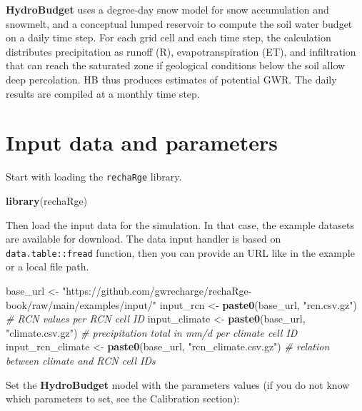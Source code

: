 \documentclass[
]{book}
\newenvironment{Shaded}{\begin{snugshade}}{\end{snugshade}}
\newcommand{\CommentTok}[1]{\textcolor[rgb]{0.56,0.35,0.01}{\textit{#1}}}
\newcommand{\FunctionTok}[1]{\textcolor[rgb]{0.13,0.29,0.53}{\textbf{#1}}}
\newcommand{\NormalTok}[1]{#1}
\newcommand{\OtherTok}[1]{\textcolor[rgb]{0.56,0.35,0.01}{#1}}
\newcommand{\StringTok}[1]{\textcolor[rgb]{0.31,0.60,0.02}{#1}}
\begin{document}
\textbf{HydroBudget} uses a degree-day snow model for snow accumulation and snowmelt, and a conceptual lumped reservoir to compute the soil water budget on a daily time step. For each grid cell and each time step, the calculation distributes precipitation as runoff (R), evapotranspiration (ET), and infiltration that can reach the saturated zone if geological conditions below the soil allow deep percolation. HB thus produces estimates of potential GWR. The daily results are compiled at a monthly time step.

\hypertarget{input-data-and-parameters}{%
\section{Input data and parameters}\label{input-data-and-parameters}}

Start with loading the \texttt{rechaRge} library.

\begin{Shaded}
\begin{Highlighting}[]
\FunctionTok{library}\NormalTok{(rechaRge)}
\end{Highlighting}
\end{Shaded}

Then load the input data for the simulation. In that case, the example datasets are available for download. The data input handler is based on \texttt{data.table::fread} function, then you can provide an URL like in the example or a local file path.

\begin{Shaded}
\begin{Highlighting}[]
\NormalTok{base\_url }\OtherTok{\textless{}{-}} \StringTok{"https://github.com/gwrecharge/rechaRge{-}book/raw/main/examples/input/"}
\NormalTok{input\_rcn }\OtherTok{\textless{}{-}} \FunctionTok{paste0}\NormalTok{(base\_url, }\StringTok{"rcn.csv.gz"}\NormalTok{) }\CommentTok{\# RCN values per RCN cell ID}
\NormalTok{input\_climate }\OtherTok{\textless{}{-}} \FunctionTok{paste0}\NormalTok{(base\_url, }\StringTok{"climate.csv.gz"}\NormalTok{) }\CommentTok{\# precipitation total in mm/d per climate cell ID}
\NormalTok{input\_rcn\_climate }\OtherTok{\textless{}{-}} \FunctionTok{paste0}\NormalTok{(base\_url, }\StringTok{"rcn\_climate.csv.gz"}\NormalTok{) }\CommentTok{\# relation between climate and RCN cell IDs}
\end{Highlighting}
\end{Shaded}

Set the \textbf{HydroBudget} model with the parameters values (if you do not know which parameters to set, see the Calibration section):
\end{document}
